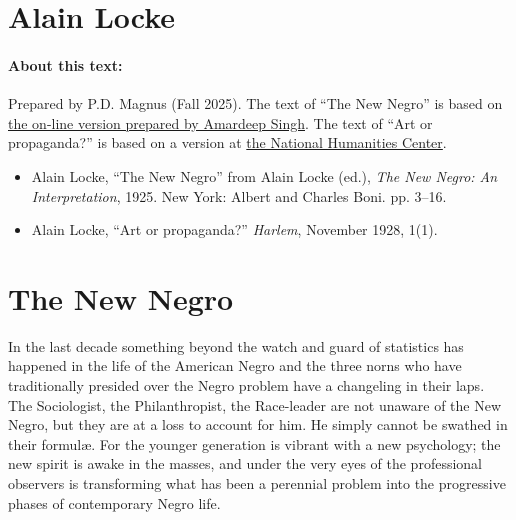 \documentclass[12pt]{article}
\begin{document}
\setcounter{footnote}{0}

\setlength{\parskip}{4pt}
\setlength{\parindent}{14pt}



\section*{Alain Locke}

\paragraph{About this text:} Prepared by P.D. Magnus (Fall 2025). The text of ``The New Negro'' is based on \href{https://scalar.lehigh.edu/african-american-poetry-a-digital-anthology/the-new-negro-an-interpretation-edited-by-alain-locke-1925}{the on-line version prepared by Amardeep Singh}. The text of ``Art or propaganda?'' is based on a version at \href{https://nationalhumanitiescenter.org/pds/maai3/index.htm}{the National Humanities Center}.

\begin{itemize}
\item Alain Locke, ``The New Negro'' from Alain Locke (ed.), \emph{The New Negro: An Interpretation}, 1925. New York: Albert and Charles Boni. pp. 3--16.

\item Alain Locke, ``Art or propaganda?'' \emph{Harlem}, November 1928, 1(1).
\end{itemize}



\section*{The New Negro}

In the last decade something beyond the watch and guard of statistics has happened in the life of the American Negro and the three norns who have traditionally presided over the Negro problem have a changeling in their laps. The Sociologist, the Philanthropist, the Race-leader are not unaware of the New Negro, but they are at a loss to account for him. He simply cannot be swathed in their formulæ. For the younger generation is vibrant with a new psychology; the new spirit is awake in the masses, and under the very eyes of the professional observers is transforming what has been a perennial problem into the progressive phases of contemporary Negro life.
\end{document}
